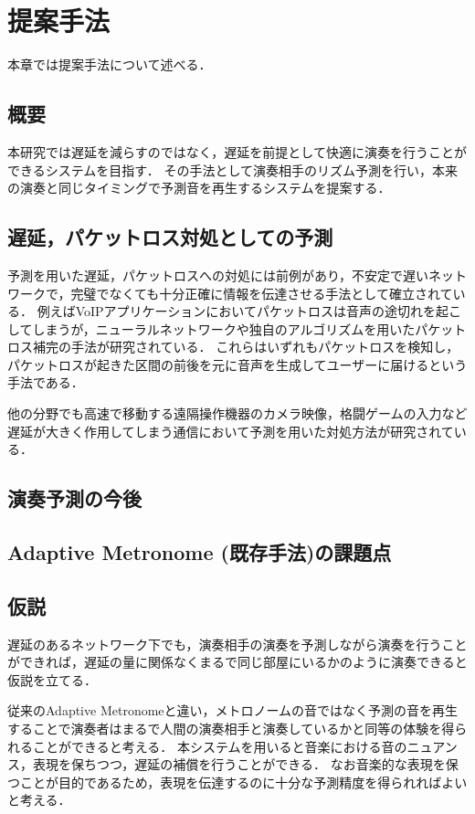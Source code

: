 \chapter{提案手法}
\label{proposed}

本章では提案手法について述べる．

\section{概要}
本研究では遅延を減らすのではなく，遅延を前提として快適に演奏を行うことができるシステムを目指す．
その手法として演奏相手のリズム予測を行い，本来の演奏と同じタイミングで予測音を再生するシステムを提案する．

\section{遅延，パケットロス対処としての予測}
予測を用いた遅延，パケットロスへの対処には前例があり，不安定で遅いネットワークで，完璧でなくても十分正確に情報を伝達させる手法として確立されている．
例えばVoIPアプリケーションにおいてパケットロスは音声の途切れを起こしてしまうが，ニューラルネットワーク\cite{zhou2022neural}\cite{Lotfidereshgi_2018}や独自のアルゴリズム\cite{Noriko}を用いたパケットロス補完の手法が研究されている．
これらはいずれもパケットロスを検知し，パケットロスが起きた区間の前後を元に音声を生成してユーザーに届けるという手法である．

他の分野でも高速で移動する遠隔操作機器のカメラ映像\cite{brudnak}，格闘ゲームの入力\cite{ggpo}\cite{ehlert}など遅延が大きく作用してしまう通信において予測を用いた対処方法が研究されている．

\section{演奏予測の今後}
\label{prediction}

\section{Adaptive Metronome (既存手法)の課題点}

\section{仮説}
遅延のあるネットワーク下でも，演奏相手の演奏を予測しながら演奏を行うことができれば，遅延の量に関係なくまるで同じ部屋にいるかのように演奏できると仮説を立てる．

従来のAdaptive Metronomeと違い，メトロノームの音ではなく予測の音を再生することで演奏者はまるで人間の演奏相手と演奏しているかと同等の体験を得られることができると考える．
本システムを用いると音楽における音のニュアンス，表現を保ちつつ，遅延の補償を行うことができる．
なお音楽的な表現を保つことが目的であるため，表現を伝達するのに十分な予測精度を得られればよいと考える．

